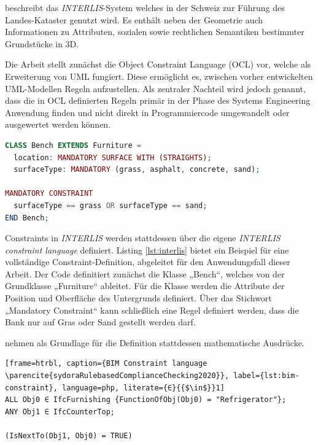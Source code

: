 \textcite{kalogianniINTERLISLanguageModelling2017} beschreibt das \textit{INTERLIS}-System welches in der Schweiz zur Führung des Landes-Kataster genutzt wird. Es enthält neben der Geometrie auch Informationen zu Attributen, sozialen sowie rechtlichen Semantiken bestimmter Grundstücke in 3D.

Die Arbeit stellt zunächst die Object Constraint Language (OCL) vor, welche als Erweiterung von UML fungiert. Diese ermöglicht es, zwischen vorher entwickelten UML-Modellen Regeln aufzustellen. Als zentraler Nachteil wird jedoch genannt, dass die in OCL definierten Regeln primär in der Phase des Systems Engineering Anwendung finden und nicht direkt in Programmiercode umgewandelt oder ausgewertet werden können.

\begin{lstlisting}[frame=htrbl, caption={INTERLIS Constraint Language Beispiel}, label={lst:interlis}, language=php]
CLASS Bench EXTENDS Furniture =
  location: MANDATORY SURFACE WITH (STRAIGHTS);
  surfaceType: MANDATORY (grass, asphalt, concrete, sand);

MANDATORY CONSTRAINT
  surfaceType == grass OR surfaceType == sand;
END Bench;
\end{lstlisting}


Constraints in \textit{INTERLIS} werden stattdessen über die eigene \textit{INTERLIS constraint language} definiert. Listing \ref{lst:interlis} bietet ein Beispiel für eine vollständige Constraint-Definition, abgeleitet für den Anwendungsfall dieser Arbeit. Der Code definitiert zunächst die Klasse „Bench“, welches von der Grundklasse „Furniture“ ableitet. Für die Klasse werden die Attribute der Position und Oberfläche des Untergrunds definiert. Über das Stichwort „Mandatory Constraint“ kann schließlich eine Regel definiert werden, dass die Bank nur auf Gras oder Sand gestellt werden darf.

\medskip

\textcite{sydoraRulebasedComplianceChecking2020} nehmen als Grundlage für die Definition stattdessen mathematische Ausdrücke. 

\begin{lstlisting}[frame=htrbl, caption={BIM Constraint language \parencite{sydoraRulebasedComplianceChecking2020}}, label={lst:bim-constraint}, language=php, literate={∈}{{$\in$}}1]
ALL Obj0 ∈ IfcFurnishing {FunctionOfObj(Obj0) = "Refrigerator"};
ANY Obj1 ∈ IfcCounterTop;

(IsNextTo(Obj1, Obj0) = TRUE)
\end{lstlisting}

